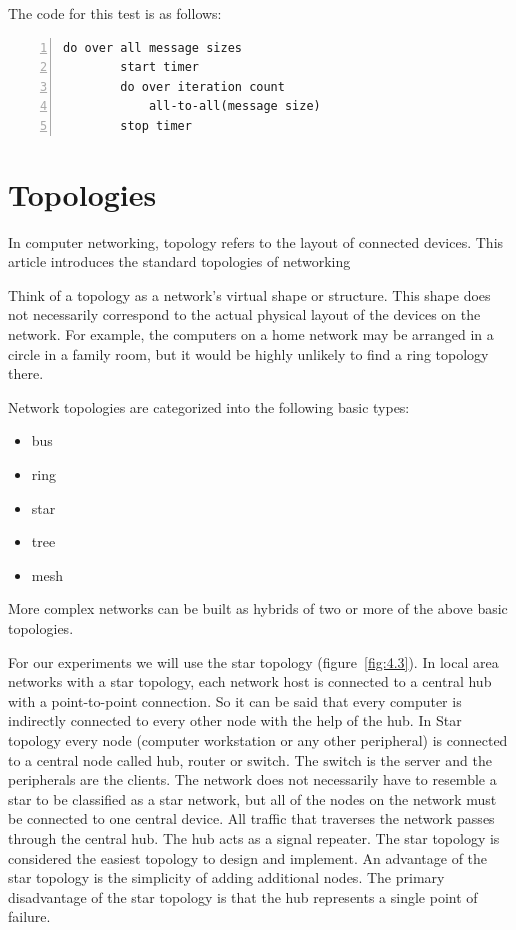 The code for this test is as follows:

\begin{lstlisting}[frame=single,numbers=left]
    do over all message sizes 
        start timer
        do over iteration count 
            all-to-all(message size)
        stop timer
\end{lstlisting}

\section{Topologies}

In computer networking, topology refers to the layout of connected devices. This
article introduces the standard topologies of networking

Think of a topology as a network's virtual shape or structure. This shape does
not necessarily correspond to the actual physical layout of the devices on the
network. For example, the computers on a home network may be arranged in a
circle in a family room, but it would be highly unlikely to find a ring
topology there.

Network topologies are categorized into the following basic types:

\begin{itemize}
    \item bus
    \item ring
    \item star
    \item tree
    \item mesh
\end{itemize}

More complex networks can be built as hybrids of two or more of the above basic
topologies.

For our experiments we will use the star topology (figure~\ref{fig:4.3}). In
local area networks with a star topology, each network host is connected to a
central hub with a point-to-point connection. So it can be said that every
computer is indirectly connected to every other node with the help of the hub.
In Star topology every node (computer workstation or any other peripheral) is
connected to a central node called hub, router or switch. The switch is the
server and the peripherals are the clients. The network does not necessarily
have to resemble a star to be classified as a star network, but all of the
nodes on the network must be connected to one central device. All traffic that
traverses the network passes through the central hub. The hub acts as a signal
repeater. The star topology is considered the easiest topology to design and
implement. An advantage of the star topology is the simplicity of adding
additional nodes. The primary disadvantage of the star topology is that the hub
represents a single point of failure.

